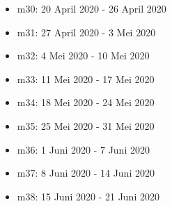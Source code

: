 \begin{itemize}
    \item m30: 20 April 2020 - 26 April 2020
    \item m31: 27 April 2020 - 3 Mei 2020
    \item m32: 4 Mei 2020 - 10 Mei 2020
    \item m33: 11 Mei 2020 - 17 Mei 2020
    \item m34: 18 Mei 2020 - 24 Mei 2020
    \item m35: 25 Mei 2020 - 31 Mei 2020
    \item m36: 1 Juni 2020 - 7 Juni 2020
    \item m37: 8 Juni 2020 - 14 Juni 2020
    \item m38: 15 Juni 2020 - 21 Juni 2020
\end{itemize}
